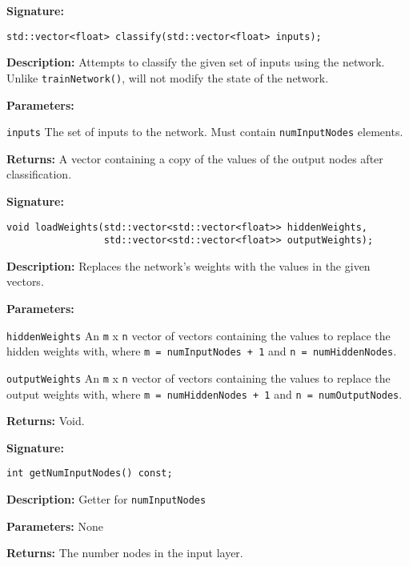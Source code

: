 \documentclass[a4paper]{article}
\begin{document}
\hrulefill %

\textbf{Signature:} \begin{lstlisting}
std::vector<float> classify(std::vector<float> inputs);
\end{lstlisting}

\textbf{Description: }
Attempts to classify the given set of inputs using the network. Unlike \lstinline{trainNetwork()}, will not modify the state of the network.

\textbf{Parameters: }

\lstinline{inputs} The set of inputs to the network. Must contain \lstinline{numInputNodes} elements.

\textbf{Returns: }
A vector containing a copy of the values of the output nodes after classification.
\hrulefill %

\textbf{Signature:} \begin{lstlisting}
void loadWeights(std::vector<std::vector<float>> hiddenWeights,
                 std::vector<std::vector<float>> outputWeights);
\end{lstlisting}

\textbf{Description: }
Replaces the network's weights with the values in the given vectors.

\textbf{Parameters: }

\lstinline{hiddenWeights} An \lstinline{m} x \lstinline{n} vector of vectors containing the values to replace the hidden weights with, where \lstinline{m = numInputNodes + 1} and \lstinline{n = numHiddenNodes}.

\lstinline{outputWeights} An \lstinline{m} x \lstinline{n} vector of vectors containing the values to replace the output weights with, where \lstinline{m = numHiddenNodes + 1} and \lstinline{n = numOutputNodes}.

\textbf{Returns: } Void.

\hrulefill %

\textbf{Signature:} \begin{lstlisting}
int getNumInputNodes() const;
\end{lstlisting}

\textbf{Description: }
Getter for \lstinline{numInputNodes}

\textbf{Parameters: } None

\textbf{Returns: }
The number nodes in the input layer.
\end{document}
